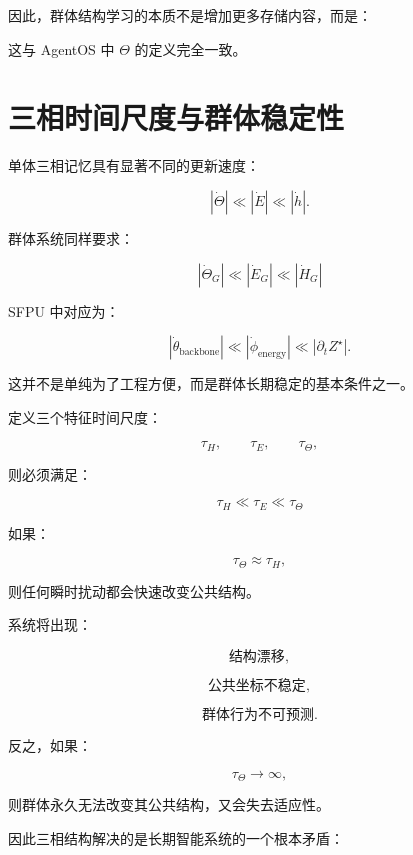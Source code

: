 因此，群体结构学习的本质不是增加更多存储内容，而是：

\begin{statementbox}
\centering
{}
\end{statementbox}

这与 AgentOS 中 $\Theta$ 的定义完全一致。


\section{三相时间尺度与群体稳定性}

单体三相记忆具有显著不同的更新速度：

\[
|\dot{\Theta}|
\ll
|\dot E|
\ll
|\dot h|.
\]

群体系统同样要求：

\[
\boxed{
|\dot{\Theta}_G|
\ll
|\dot E_G|
\ll
|\dot H_G|
}
\]

SFPU 中对应为：

\[
|\dot{\theta}_{\mathrm{backbone}}|
\ll
|\dot{\phi}_{\mathrm{energy}}|
\ll
|\partial_t Z^\star|.
\]

这并不是单纯为了工程方便，而是群体长期稳定的基本条件之一。

定义三个特征时间尺度：

\[
\tau_H,
\qquad
\tau_E,
\qquad
\tau_\Theta,
\]

则必须满足：

\[
\boxed{
\tau_H
\ll
\tau_E
\ll
\tau_\Theta
}
\]

如果：

\[
\tau_\Theta
\approx
\tau_H,
\]

则任何瞬时扰动都会快速改变公共结构。

系统将出现：

\[
\text{结构漂移},
\]

\[
\text{公共坐标不稳定},
\]

\[
\text{群体行为不可预测}.
\]

反之，如果：

\[
\tau_\Theta
\rightarrow
\infty,
\]

则群体永久无法改变其公共结构，又会失去适应性。

因此三相结构解决的是长期智能系统的一个根本矛盾：

\begin{statementbox}
\centering
{}
\end{statementbox}

